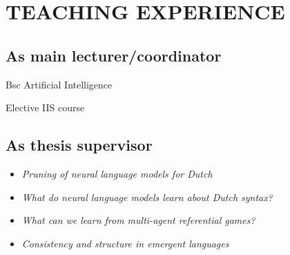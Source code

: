 \section{TEACHING EXPERIENCE}

\subsection{As main lecturer/coordinator}
{
{Bsc Artificial Intelligence}

{
{Elective IIS course}

\subsection{As thesis supervisor}
{
{\begin{itemize}
  \item[] \textit{Pruning of neural language models for Dutch}
\end{itemize}
}}

{
{\begin{itemize}
  \item[] \textit{What do neural language models learn about Dutch syntax?}
\end{itemize}
}}

{
{\begin{itemize}
  \item[] \textit{What can we learn from multi-agent referential games?}
\end{itemize}
}}

{
{\begin{itemize}
  \item[] \textit{Consistency and structure in emergent languages}
\end{itemize}
}}


}}
